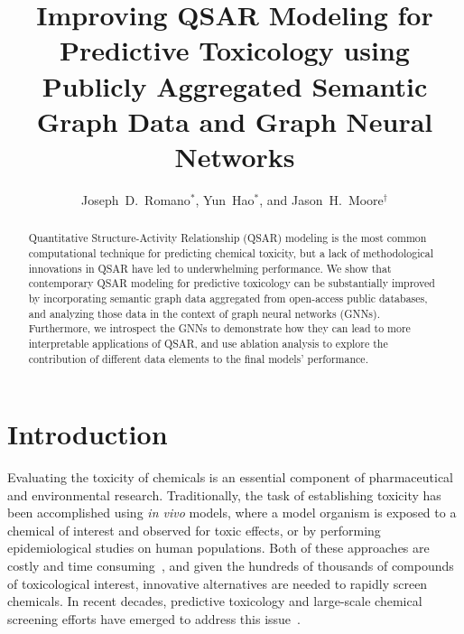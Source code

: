 \documentclass{ws-procs11x85}
\begin{document}
\title{Improving QSAR Modeling for Predictive Toxicology using Publicly Aggregated Semantic Graph Data and Graph Neural Networks}

\author{Joseph~D.~Romano$^*$, Yun~Hao$^*$, and Jason~H.~Moore$^\dag$}

\address{Institute for Biomedical Informatics, University of Pennsylvania,\\
Philadelphia, Pennsylvania 19104, United States\\
$^\dag$Corresponding author e-mail: jhmoore@upenn.edu\\
$^*$These authors contributed equally.}

\begin{abstract}
Quantitative Structure-Activity Relationship (QSAR) modeling is the most common computational technique for predicting chemical toxicity, but a lack of methodological innovations in QSAR have led to underwhelming performance.
We show that contemporary QSAR modeling for predictive toxicology can be substantially improved by incorporating semantic graph data aggregated from open-access public databases, and analyzing those data in the context of graph neural networks (GNNs).
Furthermore, we introspect the GNNs to demonstrate how they can lead to more interpretable applications of QSAR, and use ablation analysis to explore the contribution of different data elements to the final models' performance.
\end{abstract}


\section{Introduction}\label{introduction}
Evaluating the toxicity of chemicals is an essential component of pharmaceutical and environmental research.
Traditionally, the task of establishing toxicity has been accomplished using \textit{in vivo} models, where a model organism is exposed to a chemical of interest and observed for toxic effects, or by performing epidemiological studies on human populations.
Both of these approaches are costly and time consuming~\cite{raies2016silico}, and given the hundreds of thousands of compounds of toxicological interest, innovative alternatives are needed to rapidly screen chemicals.
In recent decades, predictive toxicology and large-scale chemical screening efforts have emerged to address this issue~\cite{tice2013improving,roncaglioni2013silico}.
\end{document}

